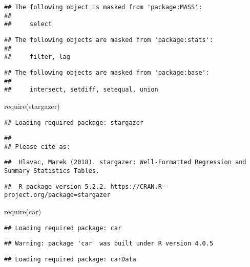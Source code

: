 \documentclass[
]{article}
\newenvironment{Shaded}{\begin{snugshade}}{\end{snugshade}}
\newcommand{\FunctionTok}[1]{\textcolor[rgb]{0.00,0.00,0.00}{#1}}
\newcommand{\NormalTok}[1]{#1}
\begin{document}
\begin{verbatim}
## The following object is masked from 'package:MASS':
## 
##     select
\end{verbatim}

\begin{verbatim}
## The following objects are masked from 'package:stats':
## 
##     filter, lag
\end{verbatim}

\begin{verbatim}
## The following objects are masked from 'package:base':
## 
##     intersect, setdiff, setequal, union
\end{verbatim}

\begin{Shaded}
\begin{Highlighting}[]
\FunctionTok{require}\NormalTok{(stargazer)}
\end{Highlighting}
\end{Shaded}

\begin{verbatim}
## Loading required package: stargazer
\end{verbatim}

\begin{verbatim}
## 
## Please cite as:
\end{verbatim}

\begin{verbatim}
##  Hlavac, Marek (2018). stargazer: Well-Formatted Regression and Summary Statistics Tables.
\end{verbatim}

\begin{verbatim}
##  R package version 5.2.2. https://CRAN.R-project.org/package=stargazer
\end{verbatim}

\begin{Shaded}
\begin{Highlighting}[]
\FunctionTok{require}\NormalTok{(car)}
\end{Highlighting}
\end{Shaded}

\begin{verbatim}
## Loading required package: car
\end{verbatim}

\begin{verbatim}
## Warning: package 'car' was built under R version 4.0.5
\end{verbatim}

\begin{verbatim}
## Loading required package: carData
\end{verbatim}
\end{document}
